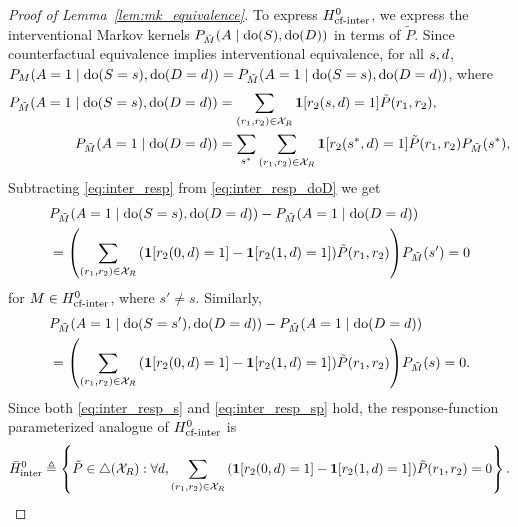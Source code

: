 \begin{proof}[Proof of Lemma~\ref{lem:mk_equivalence}]
To express $H^0_{\text{cf-inter}}$, we express the interventional Markov kernels $P_{\tilde{M}}{\left({A\mid \text{do}(S), \text{do}(D)}\right)}$ in terms of $\tilde{P}$. Since counterfactual equivalence implies interventional equivalence, for all $s, d$, $P_{M}{\left({A=1\mid \text{do}(S=s), \text{do}(D=d)}\right)} = P_{\tilde{M}}{\left({A=1\mid \text{do}(S=s), \text{do}(D=d)}\right)}$, where 
\begin{align}
    P_{\tilde{M}}{\left({A=1\mid \text{do}(S=s), \text{do}(D=d)}\right)} &= \sum\limits_{{\left({r_1,r_2}\right)}  \in {\cal X}_{R}}\bm{1}{\left[{r_2{\left({s,d}\right)}=1}\right]}\tilde{P}{\left({r_1,r_2}\right)}, \label{eq:inter_resp}\\
    P_{\tilde{M}}{\left({A=1\mid \text{do}(D=d)}\right)} &= \sum\limits_{s^*}\sum\limits_{{\left({r_1,r_2}\right)}  \in {\cal X}_{R}}\bm{1}{\left[{r_2{\left({s^*,d}\right)}=1}\right]}\tilde{P}{\left({r_1,r_2}\right)}P_{\tilde{M}}{\left({s^*}\right)} \label{eq:inter_resp_doD},
\end{align}
Subtracting \eqref{eq:inter_resp} from  \eqref{eq:inter_resp_doD} we get 
\begin{align}
    &P_{\tilde{M}}{\left({A=1\mid \text{do}(S=s), \text{do}(D=d)}\right)} - P_{\tilde{M}}{\left({A=1\mid \text{do}(D=d)}\right)} \nonumber \\
    & ={\left({\sum\limits_{{\left({r_1,r_2}\right)}  \in {\cal X}_{R}} {\left({\bm{1}{\left[{r_2{\left({0,d}\right)}=1}\right]} - \bm{1}{\left[{r_2{\left({1,d}\right)}=1}\right]}}\right)}\tilde{P}{\left({r_1,r_2}\right)}}\right)}P_{\tilde{M}}{\left({s'}\right)} = 0 \label{eq:inter_resp_s}
\end{align}
for $M \in H^0_{\text{cf-inter}}$, where $s' \neq s$. Similarly, 
\begin{align}
    &P_{\tilde{M}}{\left({A=1\mid \text{do}(S=s'), \text{do}(D=d)}\right)} - P_{\tilde{M}}{\left({A=1\mid \text{do}(D=d)}\right)} \nonumber\\
    & ={\left({\sum\limits_{{\left({r_1,r_2}\right)}  \in {\cal X}_{R}} {\left({\bm{1}{\left[{r_2{\left({0,d}\right)}=1}\right]} - \bm{1}{\left[{r_2{\left({1,d}\right)}=1}\right]}}\right)}\tilde{P}{\left({r_1,r_2}\right)}}\right)}P_{\tilde{M}}{\left({s}\right)} = 0 \label{eq:inter_resp_sp}.
\end{align}
Since both \eqref{eq:inter_resp_s} and \eqref{eq:inter_resp_sp} hold, 
 the response-function parameterized analogue of $H^0_{\text{cf-inter}}$ is 
\begin{equation}\label{eq:respfun_inter_edge}
    \bar{H}^0_{\text{inter}} \triangleq \left \lbrace \tilde{P} \in \triangle{\left({{\cal X}_{R}}\right)} : \forall d, \sum\limits_{{\left({r_1,r_2}\right)}  \in {\cal X}_{R}} {\left({\bm{1}{\left[{r_2{\left({0,d}\right)}=1}\right]} - \bm{1}{\left[{r_2{\left({1,d}\right)}=1}\right]}}\right)}\tilde{P}{\left({r_1,r_2}\right)} = 0 \right \rbrace. 
\end{equation}


\end{proof}
